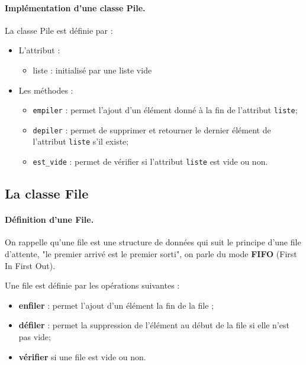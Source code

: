 \documentclass[a4paper,11pt]{article}
\theoremstyle{mytheor}
\begin{document}
\noindent
\paragraph{Implémentation d'une classe Pile.}
La classe Pile est définie par :
\begin{itemize}
	\item L'attribut :
	\begin{itemize}
		
		\item liste : initialisé par une liste vide
		
	\end{itemize}
	
	\noindent
	\item Les méthodes :
	\begin{itemize}
		
		\item \texttt{empiler} : permet l'ajout d'un élément donné à la fin de l'attribut \texttt{liste};
		
		\item \texttt{depiler} : permet de supprimer et retourner le dernier élément de l'attribut \texttt{liste} s'il existe;
		
		\item \Verb!est_vide! : permet de vérifier si l'attribut \texttt{liste} est vide ou non.
	\end{itemize}
	
	\noindent
\end{itemize}



\subsection{La classe File}
\paragraph{Définition d'une File.}
On rappelle qu'une file est une structure de données qui suit le principe d'une file d'attente, "le premier arrivé est le premier sorti", on parle du mode \textbf{FIFO} (First In First Out).

Une file est définie par les opérations suivantes :
\begin{itemize}
	\item \textbf{enfiler} : permet l'ajout d'un élément la fin de la file ;
	
	\item \textbf{défiler} : permet la suppression de l'élément au début de la file si elle n'est pas vide;
	
	\item \textbf{vérifier} si une file est vide ou non.
\end{itemize}
\end{document}
